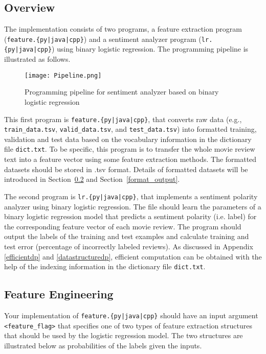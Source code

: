 \documentclass[11pt,addpoints,answers]{exam}
\begin{document}
\subsection{Overview}\label{overview}

The implementation consists of two programs, a feature extraction program (\texttt{feature.\{py|java|cpp\}}) and a sentiment analyzer program (\texttt{lr.\{py|java|cpp\}}) using binary logistic regression. The programming pipeline is illustrated as follows.

\begin{figure}[H]
        \centering
        \texttt{[image: Pipeline.png]}
        \caption{Programming pipeline for sentiment analyzer based on binary logistic regression}
        \label{pipeline}
\end{figure}


This first program is \texttt{feature.\{py|java|cpp\}}, that converts raw data (e.g., \lstinline{train_data.tsv}, \lstinline{valid_data.tsv}, and \lstinline{test_data.tsv}) into formatted training, validation and test data based on the vocabulary information in the dictionary file \lstinline{dict.txt}. To be specific, this program is to transfer the whole movie review text into a feature vector using some feature extraction methods. The formatted datasets should be stored in .tsv format. Details of formatted datasets will be introduced in Section~\ref{feature} and Section~\ref{format_output}.

The second program is \texttt{lr.\{py|java|cpp\}}, that implements a sentiment polarity analyzer using binary logistic regression. The file should learn the parameters of a binary logistic regression model that predicts a sentiment polarity (i.e. label) for the corresponding feature vector of each movie review. The program should output the labels of the training and test examples and calculate training and test error (percentage of incorrectly labeled reviews). As discussed in Appendix \ref{efficientdp} and \ref{datastructuredp}, efficient computation can be obtained with the help of the indexing information in the dictionary file \lstinline{dict.txt}.

\subsection{Feature Engineering} \label{feature}

Your implementation of \texttt{feature.\{py|java|cpp\}} should have an input argument \texttt{<feature\_flag>} that specifies one of two types of feature extraction structures that should be used by the logistic regression model. The two structures are illustrated below as probabilities of the labels given the inputs.
\end{document}
